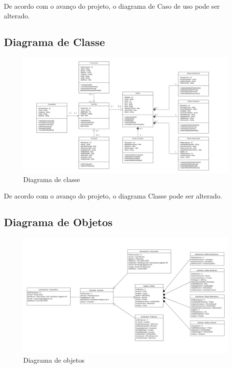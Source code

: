 \documentclass[
  a4paper,%
  12pt,%
  english,%
  brazilian,%
]{article}
\begin{document}
    De acordo com o avanço do projeto, o diagrama de Caso de uso pode ser alterado.
    \newpage
    \subsection*{Diagrama de Classe}


    \begin{figure}[h]
\centering
\caption{Diagrama de classe}%
\label{fig:diagrama-classe}
 \includegraphics[width=1.2\textwidth]{Logos/CasosClasse.png}
\end{figure}

De acordo com o avanço do projeto, o diagrama Classe pode ser alterado.

\newpage
    \subsection*{Diagrama de Objetos}

        \begin{figure}[h]
\centering
\caption{Diagrama de objetos}%
\label{fig:diagrama-objetos}
 \includegraphics[width=1.1\textwidth]{Logos/CasosObjeto.png}
\end{figure}
\end{document}
